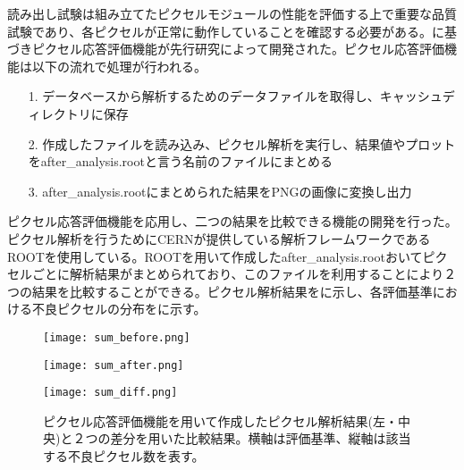 読み出し試験は組み立てたピクセルモジュールの性能を評価する上で重要な品質試験であり、各ピクセルが正常に動作していることを確認する必要がある。に基づきピクセル応答評価機能が先行研究\cite{oku}によって開発された。ピクセル応答評価機能は以下の流れで処理が行われる。
\begin{itemize}
  \item[1. ] データベースから解析するためのデータファイルを取得し、キャッシュディレクトリに保存
  \item[2. ] 作成したファイルを読み込み、ピクセル解析を実行し、結果値やプロットをafter\_analysis.rootと言う名前のファイルにまとめる
  \item[3. ] after\_analysis.rootにまとめられた結果をPNGの画像に変換し出力
\end{itemize}

ピクセル応答評価機能を応用し、二つの結果を比較できる機能の開発を行った。ピクセル解析を行うためにCERNが提供している解析フレームワークであるROOTを使用している。ROOTを用いて作成したafter\_analysis.rootおいてピクセルごとに解析結果がまとめられており、このファイルを利用することにより２つの結果を比較することができる。ピクセル解析結果をに示し、各評価基準における不良ピクセルの分布をに示す。

\begin{figure}[tbp]
 \begin{minipage}{0.33\hsize}
  \begin{center}
   \texttt{[image: sum\_before.png]}
  \end{center}
 \end{minipage}
 \begin{minipage}{0.33\hsize}
 \begin{center}
  \texttt{[image: sum\_after.png]}
 \end{center}
 \end{minipage}
 \begin{minipage}{0.33\hsize}
 \begin{center}
  \texttt{[image: sum\_diff.png]}
 \end{center}
 \end{minipage}
 \caption{ピクセル応答評価機能を用いて作成したピクセル解析結果(左・中央)と２つの差分を用いた比較結果。横軸は評価基準、縦軸は該当する不良ピクセル数を表す。}
 \label{fig:badsum}
\end{figure}

